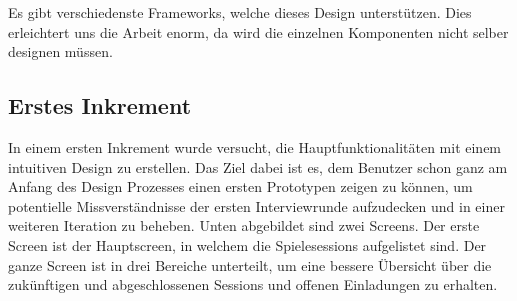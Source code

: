 Es gibt verschiedenste Frameworks, welche dieses Design unterstützen. Dies erleichtert uns die Arbeit enorm, da wird die einzelnen Komponenten nicht selber designen müssen.

\newpage

\subsection{Erstes Inkrement}
In einem ersten Inkrement wurde versucht, die Hauptfunktionalitäten mit einem intuitiven Design zu erstellen. Das Ziel dabei ist es, dem Benutzer schon ganz am Anfang des Design Prozesses einen ersten Prototypen zeigen zu können, um potentielle Missverständnisse der ersten Interviewrunde aufzudecken und in einer weiteren Iteration zu beheben. Unten abgebildet sind zwei Screens. Der erste Screen ist der Hauptscreen, in welchem die Spielesessions aufgelistet sind. Der ganze Screen ist in drei Bereiche unterteilt, um eine bessere Übersicht über die zukünftigen und abgeschlossenen Sessions und offenen Einladungen zu erhalten. 

